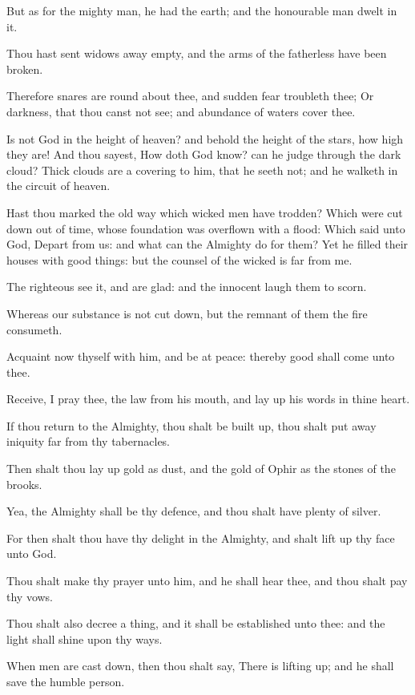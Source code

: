 \verse But as for the mighty man, he had the earth; and the honourable man dwelt in it.

\verse Thou hast sent widows away empty, and the arms of the fatherless have been broken.

\verse Therefore snares are round about thee, and sudden fear troubleth thee; \verse Or darkness, that thou canst not see; and abundance of waters cover thee.

\verse Is not God in the height of heaven? and behold the height of the stars, how high they are!  \verse And thou sayest, How doth God know?  can he judge through the dark cloud?  \verse Thick clouds are a covering to him, that he seeth not; and he walketh in the circuit of heaven.

\verse Hast thou marked the old way which wicked men have trodden?  \verse Which were cut down out of time, whose foundation was overflown with a flood: \verse Which said unto God, Depart from us: and what can the Almighty do for them?  \verse Yet he filled their houses with good things: but the counsel of the wicked is far from me.

\verse The righteous see it, and are glad: and the innocent laugh them to scorn.

\verse Whereas our substance is not cut down, but the remnant of them the fire consumeth.

\verse Acquaint now thyself with him, and be at peace: thereby good shall come unto thee.

\verse Receive, I pray thee, the law from his mouth, and lay up his words in thine heart.

\verse If thou return to the Almighty, thou shalt be built up, thou shalt put away iniquity far from thy tabernacles.

\verse Then shalt thou lay up gold as dust, and the gold of Ophir as the stones of the brooks.

\verse Yea, the Almighty shall be thy defence, and thou shalt have plenty of silver.

\verse For then shalt thou have thy delight in the Almighty, and shalt lift up thy face unto God.

\verse Thou shalt make thy prayer unto him, and he shall hear thee, and thou shalt pay thy vows.

\verse Thou shalt also decree a thing, and it shall be established unto thee: and the light shall shine upon thy ways.

\verse When men are cast down, then thou shalt say, There is lifting up; and he shall save the humble person.

